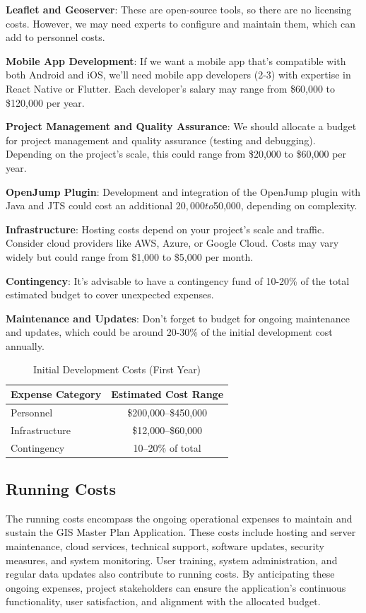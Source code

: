 \textbf{Leaflet and Geoserver}: These are open-source tools, so there are no licensing costs.
However, we may need experts to configure and maintain them, which can add to personnel costs.

\textbf{Mobile App Development}: If we want a mobile app that's compatible with both Android and iOS, we'll need mobile app developers (2-3) with expertise in React Native or Flutter.
Each developer's salary may range from \$60,000 to \$120,000 per year.

\textbf{Project Management and Quality Assurance}: We should allocate a budget for project management and quality assurance (testing and debugging).
Depending on the project's scale, this could range from \$20,000 to \$60,000 per year.

\textbf{OpenJump Plugin}: Development and integration of the OpenJump plugin with Java and JTS could cost an additional $20,000 to $50,000, depending on complexity.

\textbf{Infrastructure}: Hosting costs depend on your project's scale and traffic.
Consider cloud providers like AWS, Azure, or Google Cloud.
Costs may vary widely but could range from \$1,000 to \$5,000 per month.

\textbf{Contingency}: It's advisable to have a contingency fund of 10-20\% of the total estimated budget to cover unexpected expenses.

\textbf{Maintenance and Updates}: Don't forget to budget for ongoing maintenance and updates, which could be around 20-30\% of the initial development cost annually.

\begin{table}[h]
    \centering
    \begin{tabular}{|l|c|}
        \hline
        \textbf{Expense Category} & \textbf{Estimated Cost Range} \\
        \hline
        Personnel & \$200,000--\$450,000 \\
        \hline
        Infrastructure & \$12,000--\$60,000 \\
        \hline
        Contingency & 10--20\% of total \\
        \hline
    \end{tabular}
    \caption{Initial Development Costs (First Year)}\label{tab:init-develop-costs}
\end{table}



\subsection{Running Costs}\label{subsec:running-costs}
The running costs encompass the ongoing operational expenses to maintain and sustain the GIS Master Plan Application.
These costs include hosting and server maintenance, cloud services, technical support, software updates, security measures, and system monitoring. 
User training, system administration, and regular data updates also contribute to running costs. 
By anticipating these ongoing expenses, project stakeholders can ensure the application's continuous functionality, user satisfaction, and alignment with the allocated budget.

